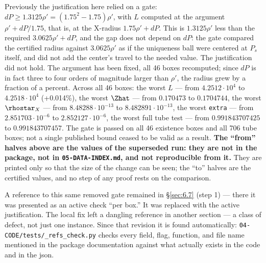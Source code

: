 \begin{remark}[Fixed]
Previously the justification here relied on a gate:
$dP \ge 1.3125\rho' = (1.75^2-1.75)\rho'$, with $L$ computed at the argument $\rho' + dP/1.75$, that is, at the X-radius $1.75\rho' + dP$. This is $1.3125\rho'$ less
than the required $3.0625\rho' + dP$, and the gap does not depend on $dP$: the
gate compared the certified radius against $3.0625\rho'$ as if the uniqueness
ball were centered at $P_s$ itself, and did not add the center's travel to
the needed value. The justification did not hold. The argument has been
fixed, all 46 boxes recomputed; since $dP$ is in fact three to four orders of
magnitude larger than $\rho'$, the radius grew by a fraction of a percent.
Across all 46 boxes: the worst $L$ --- from $4.2512 \cdot 10^4$ to $4.2518 \cdot 10^4$
(+0.014\%), the worst $\Zhat$ --- from $0.170473$ to $0.1704744$, the worst $\rhostar_X$ ---
from $8.48288 \cdot 10^{-13}$ to $8.482891 \cdot 10^{-13}$, the worst \texttt{extra} --- from
$2.851703 \cdot 10^{-6}$ to $2.852127 \cdot 10^{-6}$, the worst full tube test --- from
$0.991843707425$ to $0.991843707457$. The gate is passed on all 46 existence
boxes and all 706 tube boxes; not a single published bound ceased to be valid
as a result.
\textbf{The ``from'' halves above are the values of the superseded run: they
are not in the package, not in \texttt{05-\allowbreak DATA-\allowbreak INDEX.md},
and not reproducible from it.} They are printed only so that the size of the
change can be seen; the ``to'' halves are the certified values, and no step of
any proof rests on the comparison.
\end{remark}

\begin{remark}
A reference to this same removed gate remained in \S\ref{sec:6.7}
(step 1) --- there it was presented as an active check ``per box.'' It was
replaced with the active justification. The local fix left a dangling
reference in another section --- a class of defect, not just one instance.
Since that revision it is found automatically: \texttt{04-\allowbreak CODE/\allowbreak tests/\allowbreak \_\allowbreak refs\_\allowbreak check.py}
checks every field, flag, function, and file name mentioned in the package
documentation against what actually exists in the code and in the json.
\end{remark}

